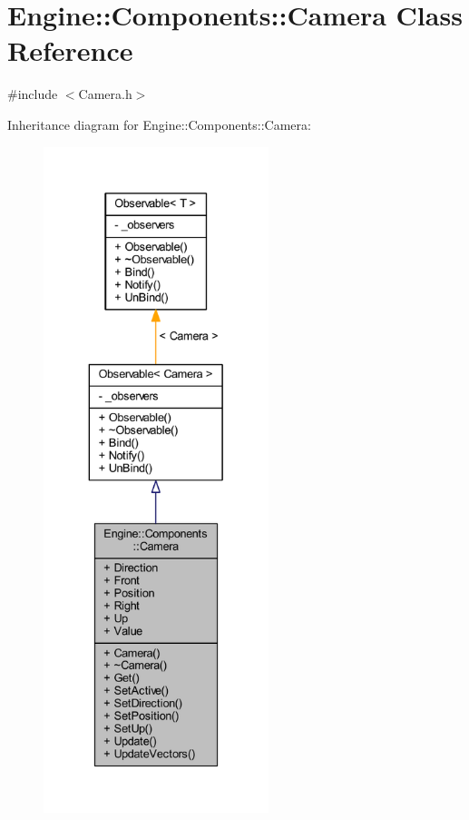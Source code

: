 \hypertarget{classEngine_1_1Components_1_1Camera}{}\section{Engine\+:\+:Components\+:\+:Camera Class Reference}
\label{classEngine_1_1Components_1_1Camera}


{\ttfamily \#include $<$Camera.\+h$>$}



Inheritance diagram for Engine\+:\+:Components\+:\+:Camera\+:
\nopagebreak
\begin{figure}[H]
\begin{center}
\leavevmode
\includegraphics[height=550pt]{classEngine_1_1Components_1_1Camera__inherit__graph}
\end{center}
\end{figure}


